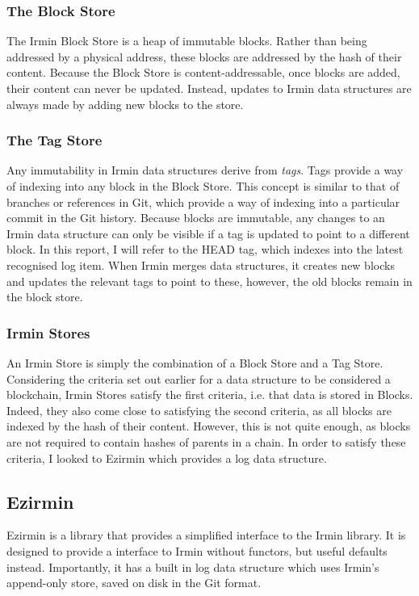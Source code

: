 \documentclass[12pt,a4paper,twoside,openright]{report}
\begin{document}
	\subsubsection*{The Block Store}
	The Irmin Block Store is a heap of immutable blocks. 
	Rather than being addressed by a physical address, these blocks are addressed by the hash of their content.
	Because the Block Store is content-addressable, once blocks are added, their content can never be updated.
	Instead, updates to Irmin data structures are always made by adding new blocks to the store.
	\subsubsection*{The Tag Store}
	Any immutability in Irmin data structures derive from \textit{tags}.
	Tags provide a way of indexing into any block in the Block Store.
	This concept is similar to that of branches or references in Git, which provide a way of indexing into a particular commit in the Git history.
	Because blocks are immutable, any changes to an Irmin data structure can only be visible if a tag is updated to point to a different block. 
	In this report, I will refer to the HEAD tag, which indexes into the latest recognised log item.
	When Irmin merges data structures, it creates new blocks and updates the relevant tags to point to these, however, the old blocks remain in the block store.
	\subsubsection*{Irmin Stores}
	An Irmin Store is simply the combination of a Block Store and a Tag Store.
	Considering the criteria set out earlier for a data structure to be considered a blockchain, Irmin Stores satisfy the first criteria, i.e. that data is stored in Blocks.
	Indeed, they also come close to satisfying the second criteria, as all blocks are indexed by the hash of their content. 
	However, this is not quite enough, as blocks are not required to contain hashes of parents in a chain.
	In order to satisfy these criteria, I looked to Ezirmin which provides a log data structure.

	\subsection{Ezirmin}
	Ezirmin is a library that provides a simplified interface to the Irmin library. 
	It is designed to provide a interface to Irmin without functors, but useful defaults instead. 
	Importantly, it has a built in log data structure which uses Irmin's append-only store, saved on disk in the Git format.
\end{document}
